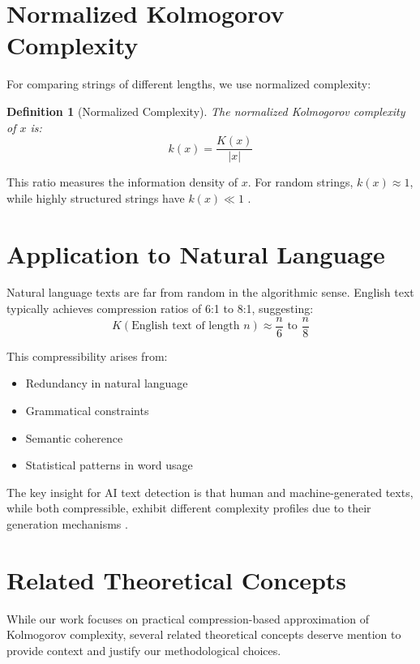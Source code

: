 \documentclass[12pt,a4paper]{report}
\newtheorem{definition}[theorem]{Definition}
\begin{document}
\section{Normalized Kolmogorov Complexity}

For comparing strings of different lengths, we use normalized complexity:

\begin{definition}[Normalized Complexity]
The normalized Kolmogorov complexity of $x$ is:
\begin{equation}
k(x) = \frac{K(x)}{|x|}
\end{equation}
\end{definition}

This ratio measures the information density of $x$. For random strings, $k(x) \approx 1$, while highly structured strings have $k(x) \ll 1$ \cite{vitanyi2022similarity}.

\section{Application to Natural Language}

Natural language texts are far from random in the algorithmic sense. English text typically achieves compression ratios of 6:1 to 8:1, suggesting:
\begin{equation}
K(\text{English text of length } n) \approx \frac{n}{6} \text{ to } \frac{n}{8}
\end{equation}

This compressibility arises from:
\begin{itemize}
    \item Redundancy in natural language
    \item Grammatical constraints
    \item Semantic coherence
    \item Statistical patterns in word usage
\end{itemize}

The key insight for AI text detection is that human and machine-generated texts, while both compressible, exhibit different complexity profiles due to their generation mechanisms \cite{solaiman2019detecting}.

\section{Related Theoretical Concepts}

While our work focuses on practical compression-based approximation of Kolmogorov complexity, several related theoretical concepts deserve mention to provide context and justify our methodological choices.
\end{document}
